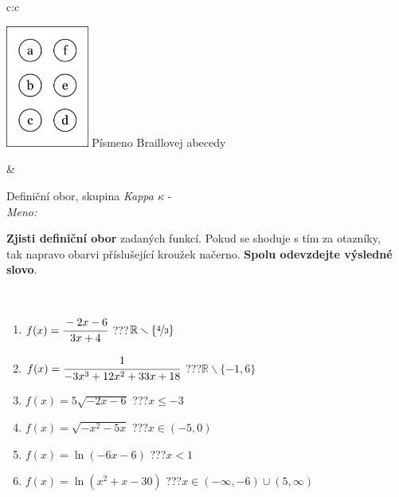 \documentclass[10pt]{report}
\begin{document}
\begin{tabular}{c:c}
\begin{minipage}[c][104.5mm][t]{0.5\linewidth}
\begin{center}
\begin{minipage}{0.20\linewidth}
\begin{center}
\includegraphics[height=40mm]{../images/braille.png}
{\small Písmeno Braillovej abecedy}
\end{center}
\end{minipage}
\end{center}
\end{minipage}
&
\begin{minipage}[c][104.5mm][t]{0.5\linewidth}
\begin{center}
\vspace{7mm}
{\huge Definiční obor, skupina \textit{Kappa $\kappa$} -}\\[5mm]
\textit{Meno:}\phantom{xxxxxxxxxxxxxxxxxxxxxxxxxxxxxxxxxxxxxxxxxxxxxxxxxxxxxxxxxxxxxxxxx}\\[5mm]
\begin{minipage}{0.95\linewidth}
\textbf{Zjisti definiční obor} zadaných funkcí. Pokud se shoduje s tím za otazníky,\\tak napravo obarvi příslušející kroužek načerno. \textbf{Spolu odevzdejte výsledné slovo}.
\end{minipage}
\\[1mm]
\begin{minipage}{0.79\linewidth}
\begin{center}
\begin{varwidth}{\linewidth}
\begin{enumerate}
\normalsizerrr
\item $f(x)=\cfrac{-2x-6}{3x+4}$\quad \dotfill\; ???\;\dotfill \quad $\mathbb{R}\smallsetminus\{\nicefrac{4}{3}\}$
\item $f(x)=\cfrac{1}{-3x^3+12x^2+33x+18}$\quad \dotfill\; ???\;\dotfill \quad $\mathbb{R}\smallsetminus\{-1,6\}$
\item $f(x)=5\sqrt{-2x-6}$\quad \dotfill\; ???\;\dotfill \quad $x\leq-3$
\item $f(x)=\sqrt{-x^2-5x}$\quad \dotfill\; ???\;\dotfill \quad $x\in(-5 , 0)$
\item $f(x)=\ln{(-6x-6)}$\quad \dotfill\; ???\;\dotfill \quad $x<1$
\item $f(x)=\ln{(x^2+x-30)}$\quad \dotfill\; ???\;\dotfill \quad $x\in(-\infty , -6)\cup(5 , \infty)$

\end{enumerate}
\end{varwidth}
\end{center}
\end{minipage}
\end{center}
\end{minipage}
\end{tabular}
\end{document}

